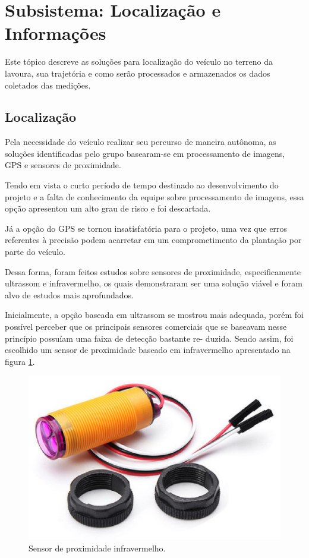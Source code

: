 \section{Subsistema: Localização e Informações}
Este tópico descreve as soluções para localização do veículo no terreno da lavoura, sua trajetória e
como serão processados e armazenados os dados coletados das medições.

  \subsection{Localização}

  Pela necessidade do veículo realizar seu percurso de maneira autônoma, as soluções identificadas
  pelo grupo basearam-se em processamento de imagens, GPS e sensores de proximidade.

  Tendo em vista o curto período de tempo destinado ao desenvolvimento do projeto e a falta de
  conhecimento da equipe sobre processamento de imagens, essa opção apresentou um alto grau de risco
  e foi descartada.

  Já a opção do GPS se tornou insatisfatória para o projeto, uma vez que erros
  referentes à precisão podem acarretar em um comprometimento da plantação
  por parte do veículo.

  Dessa forma, foram feitos estudos sobre sensores de proximidade, especificamente
  ultrassom e infravermelho, os quais demonstraram ser uma solução viável e foram alvo de
  estudos mais aprofundados.

  Inicialmente, a opção baseada em ultrassom se mostrou mais adequada, porém foi possível perceber que os principais sensores
  comerciais que se baseavam nesse princípio possuíam uma faixa de detecção bastante re-
  duzida. Sendo assim, foi escolhido um sensor de proximidade baseado em infravermelho
  apresentado na figura \ref{fig:infrared}.

  \begin{figure}[!htbp]
  \begin{center}
  \includegraphics[width=.7\textwidth]{figuras/infrared.eps}
  \caption{\label{fig:infrared}Sensor de proximidade infravermelho.}
  \end{center}
  \end{figure}

